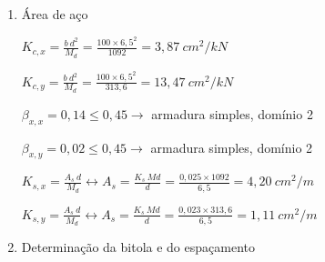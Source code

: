 \begin{resposta}
\begin{enumerate}[start=8]
\begin{enumerate}
            
            
            \item Área de aço
            
            $K_{c,x} = \frac{b \ d^2}{M_d} = \frac{100 \times 6,5^2}{1092} = 3,87 \ cm^2/kN$
            
            $K_{c,y} = \frac{b \ d^2}{M_d} = \frac{100 \times 6,5^2}{313,6} = 13,47 \ cm^2/kN$ \newline

            $\beta_{x,x} = 0,14 \leq 0,45 \to$ armadura simples, domínio 2 \cite[tabela 1.1a]{tabelaskcks}

            $\beta_{x,y} = 0,02 \leq 0,45 \to$ armadura simples, domínio 2 \cite[tabela 1.1a]{tabelaskcks} \newline

            $K_{s,x} = \frac{A_s \ d}{M_d} \longleftrightarrow A_s = \frac{K_s \ Md}{d} = \frac{0,025 \times 1092}{6,5} = 4,20 \ cm^2/m$

            $K_{s,y} = \frac{A_s \ d}{M_d} \longleftrightarrow A_s = \frac{K_s \ Md}{d} = \frac{0,023 \times 313,6}{6,5} = 1,11\ cm^2/m$ \newline

            \item Determinação da bitola e do espaçamento
            





\end{enumerate}
\end{enumerate}
\end{resposta}
